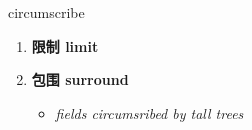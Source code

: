 
\begin{frame}
{\huge circumscribe}
\begin{center}
\begin{enumerate}\Large
  \item \textbf{限制 limit}
  \item \textbf{包围 surround}
  \begin{itemize}
    \item \em{\Large{fields circumsribed by tall trees}}
  \end{itemize}
\end{enumerate}
\end{center}
\end{frame}
